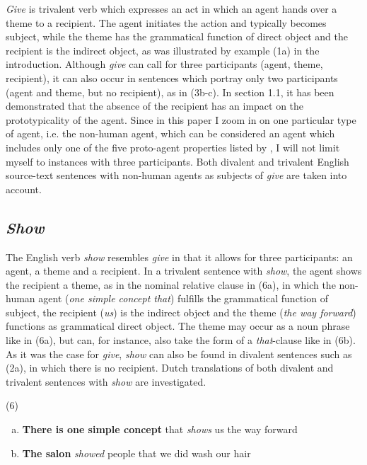 \documentclass[output=paper]{LSP/langsci}
\begin{document}
\textit{Give} is trivalent verb which expresses an act in which an agent hands over a theme to a recipient. The agent initiates the action and typically becomes subject, while the theme has the grammatical function of direct object and the recipient is the indirect object, as was illustrated by example (1a) in the introduction. Although \textit{give} can call for three participants (agent, theme, recipient), it can also occur in sentences which portray only two participants (agent and theme, but no recipient), as in (3b-c). In section 1.1, it has been demonstrated that the absence of the recipient has an impact on the prototypicality of the agent. Since in this paper I zoom in on one particular type of agent, i.e. the non-human agent, which can be considered an agent which includes only one of  the five proto-agent properties listed by \citet{Dowty1991}, I will not limit myself to instances with three participants. Both divalent and trivalent English source-text sentences with non-human agents as subjects of \textit{give} are taken into account.

\subsection{\textit{Show}}

The English verb \textit{show} resembles \textit{give} in that it allows for three participants: an agent, a theme and a recipient. In a trivalent sentence with \textit{show}, the agent shows the recipient a theme, as in the nominal relative clause in (6a), in which the non-human agent (\textit{one simple concept that}) fulfills the grammatical function of subject, the recipient (\textit{us}) is the indirect object and the theme (\textit{the way forward}) functions as grammatical direct object. The theme may occur as a noun phrase like in (6a), but can, for instance, also take the form of a \textit{that}-clause like in (6b). As it was the case for \textit{give}, \textit{show} can also be found in divalent sentences such as (2a), in which there is no recipient. Dutch translations of both divalent and trivalent sentences with \textit{show} are investigated.\newline

\noindent(6)
\begin{enumerate}[a)]
\item  \textbf{There is one simple concept} that \textit{shows} us the way forward
\item  \textbf{The salon} \textit{showed} people that we did wash our hair
\end{enumerate}
\end{document}
